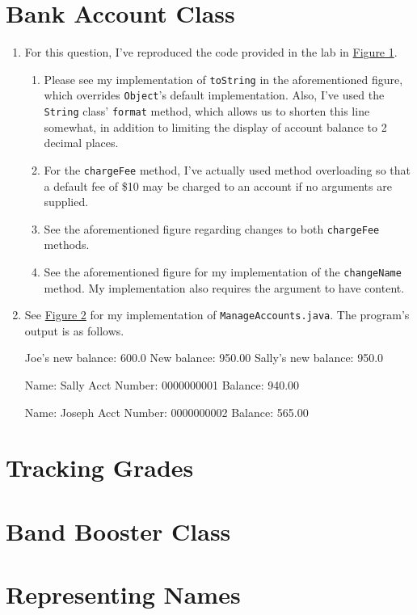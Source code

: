 \documentclass[leqno, 11pt]{article}
\newcommand{\iftcodefigure}[3]{%
  \begin{codefigure}
    \label{#1}
    \addtocounter{figure}{-1}
    
  \end{codefigure}
}
\begin{document}
\section{Bank Account Class}
\begin{enumerate}
  \item For this question, I've reproduced the code provided in the lab in \hyperref[fig:one]{Figure 1}.
        \begin{enumerate}[label=\alph*.]
          \item Please see my implementation of \texttt{toString} in the aforementioned figure, which overrides \texttt{Object}'s default implementation. Also, I've used the \texttt{String} class' \texttt{format} method, which allows us to shorten this line somewhat, in addition to limiting the display of account balance to 2 decimal places.
          \item For the \texttt{chargeFee} method, I've actually used method overloading so that a default fee of \$10 may be charged to an account if no arguments are supplied.
          \item See the aforementioned figure regarding changes to both \texttt{chargeFee} methods.
          \item See the aforementioned figure for my implementation of the \texttt{changeName} method. My implementation also requires the argument to have content.
        \end{enumerate}
  \item See \hyperref[fig:two]{Figure 2} for my implementation of \texttt{ManageAccounts.java}. The program's output is as follows.
        \begin{verbbox}[\mbox{}\scriptsize]
Joe's new balance: 600.0
New balance: 950.00
Sally's new balance: 950.0

Name: Sally
Acct Number: 0000000001
Balance: 940.00

Name: Joseph
Acct Number: 0000000002
Balance: 565.00
        \end{verbbox}
        \begin{center}
          \theverbbox
        \end{center}
\end{enumerate}
\iftcodefigure{fig:one}{Account.java}{%
  /home/brandon/eclipse-workspace/ift_194_labs/src/lab_3/Account.java}
\iftcodefigure{fig:two}{ManageAccounts.java}{%
  /home/brandon/eclipse-workspace/ift_194_labs/src/lab_3/ManageAccounts.java}
\section{Tracking Grades}
\section{Band Booster Class}
\section{Representing Names}
\end{document}
